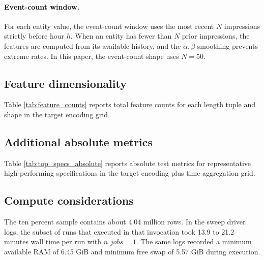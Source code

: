 \paragraph{Event-count window.}
For each entity value, the event-count window uses the most recent $N$ impressions strictly before hour $h$.
When an entity has fewer than $N$ prior impressions, the features are computed from its available history, and the $\alpha,\beta$ smoothing prevents extreme rates.
In this paper, the event-count shape uses $N=50$.

\subsection{Feature dimensionality}
\label{sec:appendix_feature_dimensionality}
Table \ref{tab:feature_counts} reports total feature counts for each length tuple and shape in the target encoding grid.

\begin{table}[t]
  \centering
  \small
  
  \caption{Total number of model input features for each window specification in the target encoding plus time aggregation grid.}
  \label{tab:feature_counts}
\end{table}

\subsection{Additional absolute metrics}
\label{sec:appendix_top_specs_absolute_metrics}
Table \ref{tab:top_specs_absolute} reports absolute test metrics for representative high-performing specifications in the target encoding plus time aggregation grid.

\begin{table}[t]
  \centering
  \small
  \resizebox{\linewidth}{!}{%
  
  }
  \caption{Absolute test metrics for selected high-performing specifications. Values are reported separately for Fold A and Fold B on the ten percent sample.}
  \label{tab:top_specs_absolute}
\end{table}

\subsection{Compute considerations}
\label{sec:appendix_compute}
The ten percent sample contains about 4.04 million rows.
In the sweep driver logs, the subset of runs that executed in that invocation took 13.9 to 21.2 minutes wall time per run with $n\_jobs=1$.
The same logs recorded a minimum available RAM of 6.45 GiB and minimum free swap of 5.57 GiB during execution.

